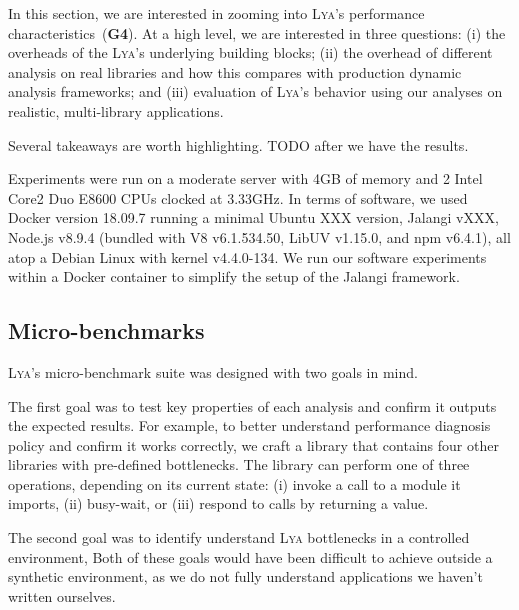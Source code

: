 \documentclass[letterpaper,twocolumn,10pt]{article}
\newcommand{\sx}[1]{(\S\ref{#1})}
\newcommand{\sys}{{\scshape Lya}\xspace}
\newcommand{\goal}[1]{(\textbf{G#1})\xspace}
\newcommand{\fixme}[1]{{\color{red}#1}}
\begin{document}
In this section, we are interested in zooming into \sys's performance characteristics~\goal{4}.
At a high level, we are interested in three questions:
(i) the overheads of the \sys's underlying building blocks;
(ii) the overhead of different analysis on real libraries and how this compares with production dynamic analysis frameworks; and
(iii) evaluation of \sys's behavior using our analyses on realistic, multi-library applications.

Several takeaways are worth highlighting.
\fixme{TODO after we have the results.}

Experiments were run on a moderate server with 4GB of memory and 2 Intel Core2 Duo E8600 CPUs clocked at 3.33GHz.
In terms of software, we used Docker version 18.09.7 running \fixme{a minimal Ubuntu XXX version}, Jalangi \fixme{vXXX}, Node.js v8.9.4 (bundled with V8 v6.1.534.50, LibUV v1.15.0, and npm v6.4.1), all atop a Debian Linux with kernel v4.4.0-134.
We run our software experiments within a Docker container to simplify the setup of the Jalangi framework.

\subsection{Micro-benchmarks}
\label{micro}

\sys's micro-benchmark suite was designed with two goals in mind.

The first goal was to test key properties of each analysis and confirm it outputs the expected results.
For example, to better understand performance diagnosis policy and confirm it works correctly, we craft a library that contains four other libraries with pre-defined bottlenecks.
The library can perform one of three operations, depending on its current state:
  (i) invoke a call to a module it imports,
  (ii) busy-wait, or
  (iii) respond to calls by returning a value.

The second goal was to identify understand \sys bottlenecks in a controlled environment, 
Both of these goals would have been difficult to achieve outside a synthetic environment, as we do not fully understand applications we haven't written ourselves.
\end{document}
